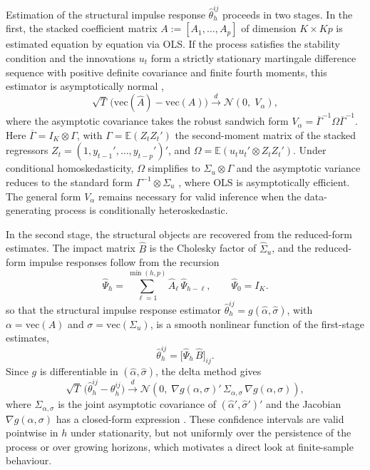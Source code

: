 Estimation of the structural impulse response $\hat{\theta}_h^{ij}$ proceeds in two stages. In
the first, the stacked coefficient matrix $A := [A_1, \ldots, A_p]$ of dimension $K \times Kp$ is
estimated equation by equation via OLS. If the process satisfies the stability condition and the
innovations $u_t$ form a strictly stationary martingale difference sequence with positive definite
covariance and finite fourth moments, this estimator is asymptotically normal
\parencite{hansen2022econometrics},
%
\begin{equation}
    \sqrt{T}\,\bigl(\mathrm{vec}(\hat{A}) - \mathrm{vec}(A)\bigr)
    \xrightarrow{d} \mathcal{N}\!\left(0,\; V_{\alpha}\right),
\end{equation}
%
where the asymptotic covariance takes the robust sandwich form
$V_{\alpha} = \overline{\Gamma}^{-1} \Omega \overline{\Gamma}^{-1}$. Here
$\overline{\Gamma} = I_K \otimes \Gamma$, with $\Gamma = \mathbb{E}(Z_t Z_t')$ the second-moment
matrix of the stacked regressors $Z_t = (1, y_{t-1}', \ldots, y_{t-p}')'$, and
$\Omega = \mathbb{E}(u_t u_t' \otimes Z_t Z_t')$. Under conditional homoskedasticity, $\Omega$
simplifies to $\Sigma_u \otimes \Gamma$ and the asymptotic variance reduces to the standard form
$\Gamma^{-1} \otimes \Sigma_u$ \parencite{lutkepohl2005}, where OLS is asymptotically efficient.
The general form $V_{\alpha}$ remains necessary for valid inference when the data-generating
process is conditionally heteroskedastic.

In the second stage, the structural objects are recovered from the reduced-form estimates. The
impact matrix $\hat{B}$ is the Cholesky factor of $\hat{\Sigma}_u$, and the reduced-form impulse
responses follow from the recursion
%
\begin{equation}
    \hat{\Psi}_h = \sum_{\ell=1}^{\min(h,p)} \hat{A}_\ell\,\hat{\Psi}_{h-\ell},
    \qquad \hat{\Psi}_0 = I_K.
    \label{eq:var_wold_recursion}
\end{equation}
%
so that the structural impulse response estimator $\hat{\theta}_h^{ij} = g(\hat{\alpha}, \hat{\sigma})$,
with $\alpha = \mathrm{vec}(A)$ and $\sigma = \mathrm{vec}(\Sigma_u)$, is a smooth nonlinear
function of the first-stage estimates,
%
\begin{equation}
    \hat{\theta}_h^{ij} = \bigl[\hat{\Psi}_h\,\hat{B}\bigr]_{ij}.
    \label{eq:var_srf_estimator}
\end{equation}
%
Since $g$ is differentiable in $(\hat{\alpha}, \hat{\sigma})$, the delta method gives
%
\begin{equation}
    \sqrt{T}\,\bigl(\hat{\theta}_h^{ij} - \theta_h^{ij}\bigr)
    \xrightarrow{d}
    \mathcal{N}\!\left(0,\;
    \nabla g(\alpha,\sigma)'\,\Sigma_{\alpha,\sigma}\,\nabla g(\alpha,\sigma)
    \right),
    \label{eq:var_delta_method}
\end{equation}
%
where $\Sigma_{\alpha,\sigma}$ is the joint asymptotic covariance of $(\hat{\alpha}', \hat{\sigma}')'$
and the Jacobian $\nabla g(\alpha, \sigma)$ has a closed-form expression
\parencite{lutkepohl1990asymptotic}. These confidence intervals are valid pointwise in $h$ under
stationarity, but not uniformly over the persistence of the process or over growing horizons,
which motivates a direct look at finite-sample behaviour.

